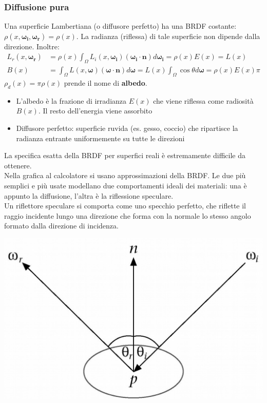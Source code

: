 \documentclass[a4paper, 10pt]{article}
\renewcommand{\vec}{\bm}
\begin{document}
		\subsubsection{Diffusione pura}
			Una superficie Lambertiana (o diffusore perfetto) ha una BRDF
			costante: $ \rho(x, \vec{\omega_i}, \vec{\omega_r}) = \rho(x) $. 
			La radianza (riflessa) di tale superficie non dipende dalla direzione.
			Inoltre:
			\begin{align*}
				L_r (x, \vec{\omega_r}) &= \rho(x) \int_{\Omega} L_i (x, \vec{\omega_i} )(\vec{\omega_i} \cdot \vec{n}) d\vec{\omega_i} =
				\rho(x)E(x) = L(x) \\
				B(x) &= \int_{\Omega} L (x, \vec{\omega} )(\vec{\omega} \cdot \vec{n}) d\vec{\omega} = L(x) \int_{\Omega} \cos\theta d\vec{\omega} = \rho(x) E(x)\pi
			\end{align*}
			$ \rho_d(x)= \pi \rho(x) $ prende il nome di \textbf{albedo}.
			\begin{itemize}
				\item L’albedo è la frazione di irradianza $ E(x) $ che viene riflessa come
				radiosità $ B(x) $. Il resto dell’energia viene assorbito
				\item Diffusore perfetto: superficie ruvida (es. gesso, coccio) che ripartisce
				la radianza entrante uniformemente su tutte le direzioni
			\end{itemize}
			
			\bigskip
			
			La specifica esatta della BRDF per superfici reali è estremamente
			difficile da ottenere.\\
			Nella grafica al calcolatore si usano approssimazioni della
			BRDF. Le due più semplici e più usate modellano due
			comportamenti ideali dei materiali: una è appunto la
			diffusione, l'altra è la riflessione speculare.\\
			Un riflettore speculare si comporta come uno specchio
			perfetto, che riflette il raggio incidente lungo una direzione
			che forma con la normale lo	stesso angolo formato dalla
			direzione di incidenza.
			\begin{center}
				\includegraphics[scale=0.15]{brdf1}
			\end{center}
			
\end{document}
